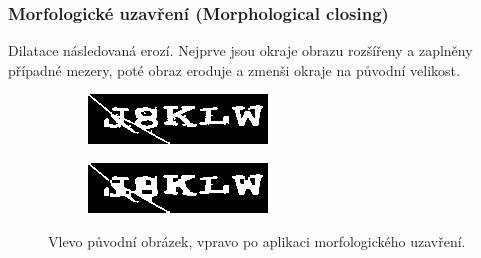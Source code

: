 \documentclass[
  field=ainfp,
  master=true,
  biblatex,
  sourcecodes=false,
  theorems=false,
  glossaries,
  index
]{kidiplom}
\begin{document}
\subsubsection*{Morfologické uzavření (Morphological closing)}
Dilatace následovaná erozí. Nejprve jsou okraje obrazu rozšířeny a zaplněny případné mezery, poté obraz eroduje a zmenši okraje na původní velikost.
\begin{figure}[H]
\centering
\begin{subfigure}{.5\textwidth}
  \centering
  \includegraphics[width=.8\linewidth]{images/closing_original.png}
\end{subfigure}%
\begin{subfigure}{.5\textwidth}
  \centering
  \includegraphics[width=.8\linewidth]{images/closing_result.png}
\end{subfigure}
\caption{Vlevo původní obrázek, vpravo po aplikaci morfologického uzavření.}
\label{fig:inverse_example}
\end{figure}
\end{document}
